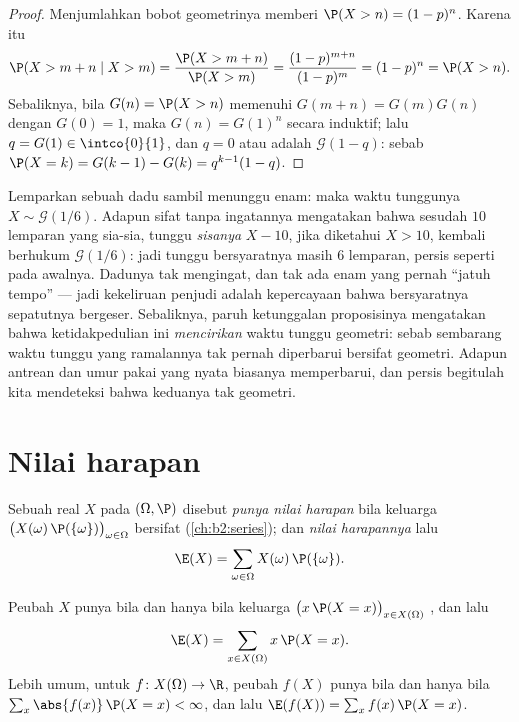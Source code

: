 \begin{proof}
Menjumlahkan bobot geometrinya memberi $\P(X > n) = (1-p)^n$. Karena itu
\[
\P(X > m + n \mid X > m)
= \frac{\P(X > m + n)}{\P(X > m)}
= \frac{(1-p)^{m+n}}{(1-p)^m} = (1-p)^n = \P(X > n).
\]
Sebaliknya, bila $G(n) = \P(X > n)$ memenuhi $G(m + n) =
G(m)G(n)$ dengan $G(0) = 1$, maka $G(n) = G(1)^n$ secara induktif; lalu $q =
G(1) \in \intco{0}{1}$, dan $q = 0$ atau  adalah
$\mathcal{G}(1 - q)$: sebab $\P(X = k) = G(k-1) - G(k) =
q^{k-1}(1 - q)$.
\end{proof}

\begin{example}
Lemparkan sebuah dadu sambil menunggu enam: maka waktu tunggunya $X \sim
\mathcal G(1/6)$. Adapun sifat tanpa ingatannya mengatakan bahwa sesudah $10$
lemparan yang sia-sia, tunggu \emph{sisanya} $X - 10$, jika diketahui
$X > 10$, kembali berhukum $\mathcal G(1/6)$: jadi 
tunggu bersyaratnya masih $6$ lemparan, persis seperti pada awalnya.
Dadunya tak mengingat, dan tak ada enam yang pernah ``jatuh tempo'' --- jadi
kekeliruan penjudi adalah kepercayaan bahwa  bersyaratnya
sepatutnya bergeser. Sebaliknya, paruh ketunggalan proposisinya
mengatakan bahwa ketidakpedulian ini \emph{mencirikan} waktu tunggu
geometri: sebab sembarang waktu tunggu yang ramalannya tak pernah diperbarui
bersifat geometri. Adapun antrean dan umur pakai yang nyata biasanya memperbarui,
dan persis begitulah kita mendeteksi bahwa keduanya tak geometri.
\end{example}

\section{Nilai harapan}

\begin{definition}\label{def:b2:randomvar:expectation}
Sebuah  real $X$ pada $(\Omega, \P)$ disebut \emph{punya
nilai harapan} bila keluarga
$\bigl(X(\omega)\,\P(\{\omega\})\bigr)_{\omega \in \Omega}$ bersifat
 (\cref{ch:b2:series}); dan \emph{nilai harapannya} lalu
\[
\E(X) = \sum_{\omega \in \Omega} X(\omega)\,\P(\{\omega\}) .
\]
\end{definition}

\begin{theorem}\label{thm:b2:randomvar:transfer}
Peubah $X$ punya  bila dan hanya bila keluarga $\bigl(x\,\P(X =
x)\bigr)_{x \in X(\Omega)}$ , dan lalu
\[
\E(X) = \sum_{x \in X(\Omega)} x\,\P(X = x) .
\]
Lebih umum, untuk $f \colon X(\Omega) \to \R$, peubah
$f(X)$ punya  bila dan hanya bila $\sum_x \abs{f(x)}\,\P(X = x) <
\infty$, dan lalu $\E(f(X)) = \sum_x f(x)\,\P(X = x)$.
\end{theorem}


